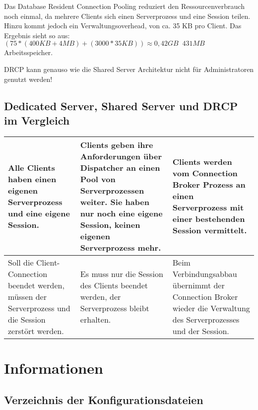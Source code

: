           Das Database Resident Connection Pooling reduziert den Ressourcenverbrauch noch einmal, da mehrere Clients sich einen Serverprozess und eine Session teilen. Hinzu kommt jedoch ein Verwaltungsoverhead, von ca. 35 KB pro Client. Das Ergebnis sieht so aus: $(75 * (400 KB + 4 MB) + (3000 * 35 KB)) \approx 0,42 GB \mathop{\widehat{=}} 431 MB$ Arbeitsspeicher.

          \begin{merke}
            DRCP kann genauso wie die Shared Server Architektur nicht für Administratoren genutzt werden!
          \end{merke}

      \subsection{Dedicated Server, Shared Server und DRCP im Vergleich}
        \begin{center}
          \begin{small}
            \tabletail{
              \hline
            }
            \begin{supertabular}[h]{|p{4.9cm}|p{4.9cm}|p{4.9cm}|}
              Alle Clients haben einen eigenen Serverprozess und eine eigene Session.& Clients geben ihre Anforderungen über Dispatcher an einen Pool von Serverprozessen weiter. Sie haben nur noch eine eigene Session, keinen eigenen Serverprozess mehr. & Clients werden vom Connection Broker Prozess an einen Serverprozess mit einer bestehenden Session vermittelt. \\
              \hline
              Soll die Client-Connection beendet werden, müssen der Serverprozess und die Session zerstört werden. & Es muss nur die Session des Clients beendet werden, der Serverprozess bleibt erhalten. & Beim Verbindungsabbau übernimmt der Connection Broker wieder die Verwaltung des Serverprozesses und der Session. \\
              \hline
            \end{supertabular}
          \end{small}
        \end{center}
    \section{Informationen}
      \subsection{Verzeichnis der Konfigurationsdateien}
        \begin{literaturinternet}
          \item  \cite{NETRF011}
          \item  \cite{NETRF008}
          \item  \cite{NETRF007}
          \item  \cite{NETRF006}
        \end{literaturinternet}
\clearpage
